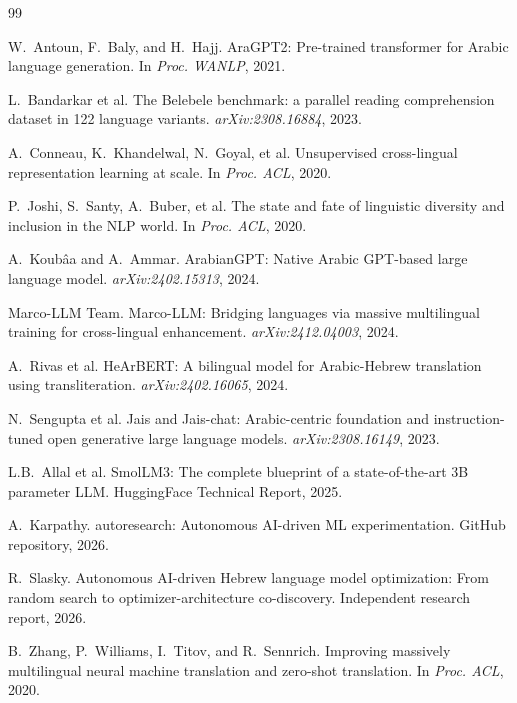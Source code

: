\documentclass[10pt,twocolumn]{article}
\begin{document}

\begin{thebibliography}{99}

W.~Antoun, F.~Baly, and H.~Hajj.
\newblock AraGPT2: Pre-trained transformer for Arabic language generation.
\newblock In \emph{Proc. WANLP}, 2021.

L.~Bandarkar et al.
\newblock The Belebele benchmark: a parallel reading comprehension dataset in 122 language variants.
\newblock \emph{arXiv:2308.16884}, 2023.

A.~Conneau, K.~Khandelwal, N.~Goyal, et al.
\newblock Unsupervised cross-lingual representation learning at scale.
\newblock In \emph{Proc. ACL}, 2020.

P.~Joshi, S.~Santy, A.~Buber, et al.
\newblock The state and fate of linguistic diversity and inclusion in the NLP world.
\newblock In \emph{Proc. ACL}, 2020.

A.~Koub\^{a}a and A.~Ammar.
\newblock ArabianGPT: Native Arabic GPT-based large language model.
\newblock \emph{arXiv:2402.15313}, 2024.

Marco-LLM Team.
\newblock Marco-LLM: Bridging languages via massive multilingual training for cross-lingual enhancement.
\newblock \emph{arXiv:2412.04003}, 2024.

A.~Rivas et al.
\newblock HeArBERT: A bilingual model for Arabic-Hebrew translation using transliteration.
\newblock \emph{arXiv:2402.16065}, 2024.

N.~Sengupta et al.
\newblock Jais and Jais-chat: Arabic-centric foundation and instruction-tuned open generative large language models.
\newblock \emph{arXiv:2308.16149}, 2023.

L.B.~Allal et al.
\newblock SmolLM3: The complete blueprint of a state-of-the-art 3B parameter LLM.
\newblock HuggingFace Technical Report, 2025.

A.~Karpathy.
\newblock autoresearch: Autonomous AI-driven ML experimentation.
\newblock GitHub repository, 2026.

R.~Slasky.
\newblock Autonomous AI-driven Hebrew language model optimization: From random search to optimizer-architecture co-discovery.
\newblock Independent research report, 2026.

B.~Zhang, P.~Williams, I.~Titov, and R.~Sennrich.
\newblock Improving massively multilingual neural machine translation and zero-shot translation.
\newblock In \emph{Proc. ACL}, 2020.

\end{thebibliography}
\end{document}
